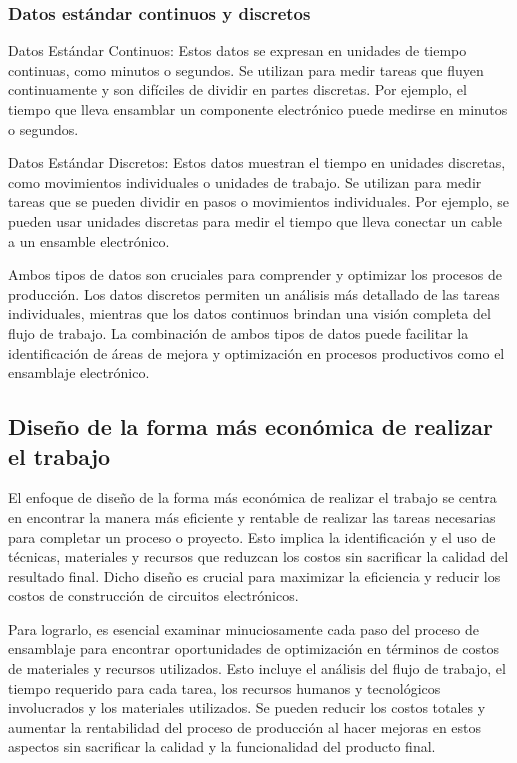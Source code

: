     \subsubsection{Datos estándar continuos y discretos}
    Datos Estándar Continuos: Estos datos se expresan en unidades de tiempo continuas, como minutos o segundos. Se utilizan para medir tareas que fluyen continuamente y son difíciles de dividir en partes discretas. Por ejemplo, el tiempo que lleva ensamblar un componente electrónico puede medirse en minutos o segundos.
    
    Datos Estándar Discretos: Estos datos muestran el tiempo en unidades discretas, como movimientos individuales o unidades de trabajo. Se utilizan para medir tareas que se pueden dividir en pasos o movimientos individuales. Por ejemplo, se pueden usar unidades discretas para medir el tiempo que lleva conectar un cable a un ensamble electrónico.
    
    Ambos tipos de datos son cruciales para comprender y optimizar los procesos de producción. Los datos discretos permiten un análisis más detallado de las tareas individuales, mientras que los datos continuos brindan una visión completa del flujo de trabajo. La combinación de ambos tipos de datos puede facilitar la identificación de áreas de mejora y optimización en procesos productivos como el ensamblaje electrónico.
    
    \subsection{Diseño de la forma más económica de realizar el trabajo}
    El enfoque de diseño de la forma más económica de realizar el trabajo se centra en encontrar la manera más eficiente y rentable de realizar las tareas necesarias para completar un proceso o proyecto. Esto implica la identificación y el uso de técnicas, materiales y recursos que reduzcan los costos sin sacrificar la calidad del resultado final. Dicho diseño es crucial para maximizar la eficiencia y reducir los costos de construcción de circuitos electrónicos.
    
    Para lograrlo, es esencial examinar minuciosamente cada paso del proceso de ensamblaje para encontrar oportunidades de optimización en términos de costos de materiales y recursos utilizados. Esto incluye el análisis del flujo de trabajo, el tiempo requerido para cada tarea, los recursos humanos y tecnológicos involucrados y los materiales utilizados. Se pueden reducir los costos totales y aumentar la rentabilidad del proceso de producción al hacer mejoras en estos aspectos sin sacrificar la calidad y la funcionalidad del producto final.
    
